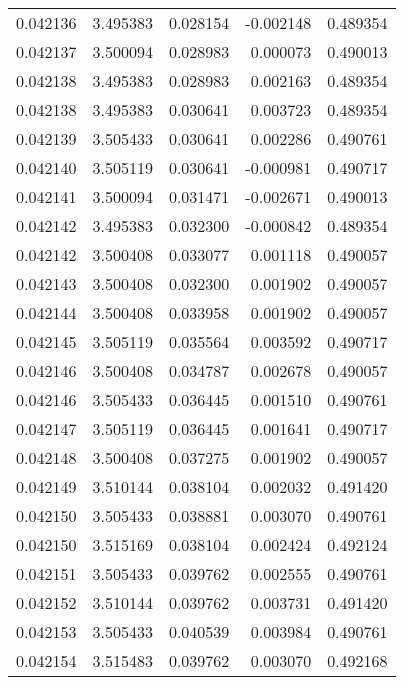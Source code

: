 \begin{tabular}{lrrrr}
0.042136    &  3.495383 &  0.028154 & -0.002148 &             0.489354 \\
0.042137    &  3.500094 &  0.028983 &  0.000073 &             0.490013 \\
0.042138    &  3.495383 &  0.028983 &  0.002163 &             0.489354 \\
0.042138    &  3.495383 &  0.030641 &  0.003723 &             0.489354 \\
0.042139    &  3.505433 &  0.030641 &  0.002286 &             0.490761 \\
0.042140    &  3.505119 &  0.030641 & -0.000981 &             0.490717 \\
0.042141    &  3.500094 &  0.031471 & -0.002671 &             0.490013 \\
0.042142    &  3.495383 &  0.032300 & -0.000842 &             0.489354 \\
0.042142    &  3.500408 &  0.033077 &  0.001118 &             0.490057 \\
0.042143    &  3.500408 &  0.032300 &  0.001902 &             0.490057 \\
0.042144    &  3.500408 &  0.033958 &  0.001902 &             0.490057 \\
0.042145    &  3.505119 &  0.035564 &  0.003592 &             0.490717 \\
0.042146    &  3.500408 &  0.034787 &  0.002678 &             0.490057 \\
0.042146    &  3.505433 &  0.036445 &  0.001510 &             0.490761 \\
0.042147    &  3.505119 &  0.036445 &  0.001641 &             0.490717 \\
0.042148    &  3.500408 &  0.037275 &  0.001902 &             0.490057 \\
0.042149    &  3.510144 &  0.038104 &  0.002032 &             0.491420 \\
0.042150    &  3.505433 &  0.038881 &  0.003070 &             0.490761 \\
0.042150    &  3.515169 &  0.038104 &  0.002424 &             0.492124 \\
0.042151    &  3.505433 &  0.039762 &  0.002555 &             0.490761 \\
0.042152    &  3.510144 &  0.039762 &  0.003731 &             0.491420 \\
0.042153    &  3.505433 &  0.040539 &  0.003984 &             0.490761 \\
0.042154    &  3.515483 &  0.039762 &  0.003070 &             0.492168 \\

\end{tabular}
